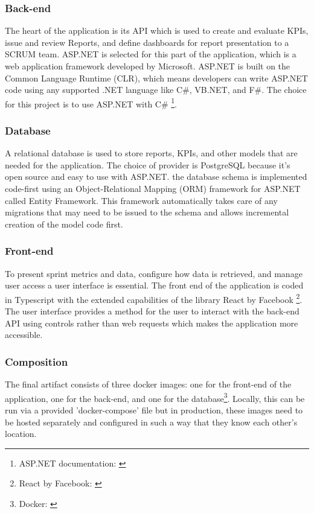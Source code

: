 \subsubsection{Back-end}

The heart of the application is its API which is used to create and evaluate KPIs, issue and review Reports, and define dashboards for report presentation to a SCRUM team. ASP.NET is selected for this part of the application, which is a web application framework developed by Microsoft. ASP.NET is built on the Common Language Runtime (CLR), which means developers can write ASP.NET code using any supported .NET language like C\#, VB.NET, and F\#. The choice for this project is to use ASP.NET with C\# \footnote{ASP.NET documentation: \cite{ASPNETDocumentation}}.

\subsubsection{Database}

A relational database is used to store reports, KPIs, and other models that are needed for the application. The choice of provider is PostgreSQL because it's open source and easy to use with ASP.NET. the database schema is implemented code-first using an Object-Relational Mapping (ORM) framework for ASP.NET called Entity Framework. This framework automatically takes care of any migrations that may need to be issued to the schema and allows incremental creation of the model code first.

\subsubsection{Front-end}

To present sprint metrics and data, configure how data is retrieved, and manage user access a user interface is essential.
The front end of the application is coded in Typescript with the extended capabilities of the library React by Facebook \footnote{React by Facebook: \cite{ReactDev}}. The user interface provides a method for the user to interact with the back-end API using controls rather than web requests which makes the application more accessible.  

\subsubsection{Composition}

The final artifact consists of three docker images: one for the front-end of the application, one for the back-end, and one for the database\footnote{Docker: \cite{DockerGetStarted}}.
Locally, this can be run via a provided 'docker-compose' file but in production, these images need to be hosted separately and configured in such a way that they know each other's location.

